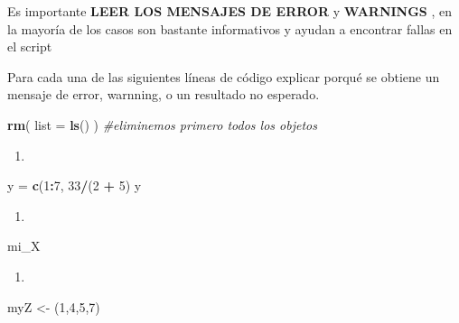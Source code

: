 \documentclass[]{book}
\newenvironment{Shaded}{\begin{snugshade}}{\end{snugshade}}
\newcommand{\CommentTok}[1]{\textcolor[rgb]{0.56,0.35,0.01}{\textit{#1}}}
\newcommand{\DataTypeTok}[1]{\textcolor[rgb]{0.13,0.29,0.53}{#1}}
\newcommand{\DecValTok}[1]{\textcolor[rgb]{0.00,0.00,0.81}{#1}}
\newcommand{\KeywordTok}[1]{\textcolor[rgb]{0.13,0.29,0.53}{\textbf{#1}}}
\newcommand{\NormalTok}[1]{#1}
\newcommand{\OperatorTok}[1]{\textcolor[rgb]{0.81,0.36,0.00}{\textbf{#1}}}
\newcommand{\StringTok}[1]{\textcolor[rgb]{0.31,0.60,0.02}{#1}}
\begin{document}
Es importante \textbf{LEER LOS MENSAJES DE ERROR} y \textbf{WARNINGS
}, en la mayoría de los casos son bastante informativos y ayudan a encontrar fallas en el script

Para cada una de las siguientes líneas de código explicar porqué se obtiene un mensaje de error, warnning, o un resultado no esperado.

\begin{Shaded}
\begin{Highlighting}[]
\KeywordTok{rm}\NormalTok{( }\DataTypeTok{list =} \KeywordTok{ls}\NormalTok{() ) }\CommentTok{#eliminemos primero todos los objetos}
\end{Highlighting}
\end{Shaded}

\begin{enumerate}
\def\labelenumi{\arabic{enumi}.}
\item
\end{enumerate}

\begin{Shaded}
\begin{Highlighting}[]
\NormalTok{  y =}\StringTok{ }\KeywordTok{c}\NormalTok{(}\DecValTok{1}\OperatorTok{:}\DecValTok{7}\NormalTok{, }\DecValTok{33}\OperatorTok{/}\NormalTok{(}\DecValTok{2} \OperatorTok{+}\StringTok{ }\DecValTok{5}\NormalTok{)}
\NormalTok{  y}
\end{Highlighting}
\end{Shaded}

\begin{enumerate}
\def\labelenumi{\arabic{enumi}.}
\setcounter{enumi}{1}
\item
\end{enumerate}

\begin{Shaded}
\begin{Highlighting}[]
\NormalTok{  mi_X}
\end{Highlighting}
\end{Shaded}

\begin{enumerate}
\def\labelenumi{\arabic{enumi}.}
\setcounter{enumi}{2}
\item
\end{enumerate}

\begin{Shaded}
\begin{Highlighting}[]
\NormalTok{  myZ <-}\StringTok{ }\NormalTok{(}\DecValTok{1}\NormalTok{,}\DecValTok{4}\NormalTok{,}\DecValTok{5}\NormalTok{,}\DecValTok{7}\NormalTok{)}
\end{Highlighting}
\end{Shaded}
\end{document}

